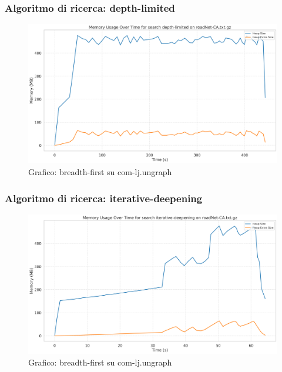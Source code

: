 \documentclass{article}
\begin{document}
\subsubsection{Algoritmo di ricerca: depth-limited}
\begin{figure}[h]\centering
\includegraphics[width=\textwidth]{../plots/roadNet-CA_depth-limited.png}
\caption{Grafico: breadth-first su com-lj.ungraph}
\end{figure}
\subsubsection{Algoritmo di ricerca: iterative-deepening}
\begin{figure}[h]\centering
\includegraphics[width=\textwidth]{../plots/roadNet-CA_iterative-deepening.png}
\caption{Grafico: breadth-first su com-lj.ungraph}
\end{figure}
\end{document}
